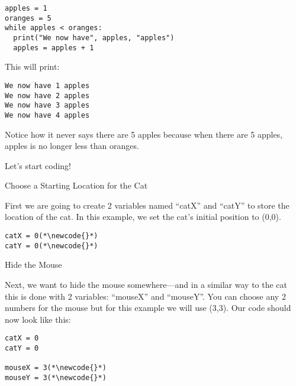 \documentclass[12pt,oneside]{article}
\newcommand{\q}[1]{``#1''}
\newcommand{\subsectitle}[1]{
  \begin{flushleft}{\large#1}\end{flushleft}
}
\newcommand{\sectitle}[1]{
  \newpage
  \begin{flushleft}{\Large#1}\end{flushleft}
}
\newcommand{\newcode}[0]{\hfill<--}
\begin{document}
\begin{lstlisting}
apples = 1
oranges = 5
while apples < oranges:
  print("We now have", apples, "apples")
  apples = apples + 1
\end{lstlisting}

This will print:

\begin{lstlisting}
We now have 1 apples
We now have 2 apples
We now have 3 apples
We now have 4 apples
\end{lstlisting}

Notice how it never says there are 5 apples because when there are 5 apples, apples is no longer less than oranges.

\sectitle{Let's start coding!}

\begin{minipage}{\textwidth}
\subsectitle{Choose a Starting Location for the Cat}

First we are going to create 2 variables named \q{catX} and \q{catY} to store the location of the cat. In this example, we set the cat's initial position to (0,0).

\begin{lstlisting}
catX = 0(*\newcode{}*)
catY = 0(*\newcode{}*)
\end{lstlisting}
\end{minipage}

\begin{minipage}{\textwidth}
\subsectitle{Hide the Mouse}

Next, we want to hide the mouse somewhere---and in a similar way to the cat this is done with 2 variables: \q{mouseX} and \q{mouseY}. You can choose any 2 numbers for the mouse but for this example we will use (3,3). Our code should now look like this:

\begin{lstlisting}
catX = 0
catY = 0

mouseX = 3(*\newcode{}*)
mouseY = 3(*\newcode{}*)
\end{lstlisting}
\end{minipage}
\end{document}

